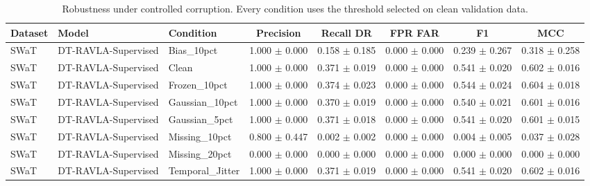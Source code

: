 \begin{table}[t]
\centering
\caption{Robustness under controlled corruption. Every condition uses the threshold selected on clean validation data.}
\label{tab:robustness}
\renewcommand{\arraystretch}{1.12}
\setlength{\tabcolsep}{4pt}
\begin{tabular}{lllccccc}
\hline
Dataset & Model & Condition & Precision & Recall DR & FPR FAR & F1 & MCC \\
\hline
SWaT & DT-RAVLA-Supervised & Bias_10pct & 1.000 $\pm$ 0.000 & 0.158 $\pm$ 0.185 & 0.000 $\pm$ 0.000 & 0.239 $\pm$ 0.267 & 0.318 $\pm$ 0.258 \\
SWaT & DT-RAVLA-Supervised & Clean & 1.000 $\pm$ 0.000 & 0.371 $\pm$ 0.019 & 0.000 $\pm$ 0.000 & 0.541 $\pm$ 0.020 & 0.602 $\pm$ 0.016 \\
SWaT & DT-RAVLA-Supervised & Frozen_10pct & 1.000 $\pm$ 0.000 & 0.374 $\pm$ 0.023 & 0.000 $\pm$ 0.000 & 0.544 $\pm$ 0.024 & 0.604 $\pm$ 0.018 \\
SWaT & DT-RAVLA-Supervised & Gaussian_10pct & 1.000 $\pm$ 0.000 & 0.370 $\pm$ 0.019 & 0.000 $\pm$ 0.000 & 0.540 $\pm$ 0.021 & 0.601 $\pm$ 0.016 \\
SWaT & DT-RAVLA-Supervised & Gaussian_5pct & 1.000 $\pm$ 0.000 & 0.371 $\pm$ 0.018 & 0.000 $\pm$ 0.000 & 0.541 $\pm$ 0.020 & 0.601 $\pm$ 0.015 \\
SWaT & DT-RAVLA-Supervised & Missing_10pct & 0.800 $\pm$ 0.447 & 0.002 $\pm$ 0.002 & 0.000 $\pm$ 0.000 & 0.004 $\pm$ 0.005 & 0.037 $\pm$ 0.028 \\
SWaT & DT-RAVLA-Supervised & Missing_20pct & 0.000 $\pm$ 0.000 & 0.000 $\pm$ 0.000 & 0.000 $\pm$ 0.000 & 0.000 $\pm$ 0.000 & 0.000 $\pm$ 0.000 \\
SWaT & DT-RAVLA-Supervised & Temporal_Jitter & 1.000 $\pm$ 0.000 & 0.371 $\pm$ 0.019 & 0.000 $\pm$ 0.000 & 0.541 $\pm$ 0.020 & 0.602 $\pm$ 0.016 \\
\hline
\end{tabular}
\end{table}